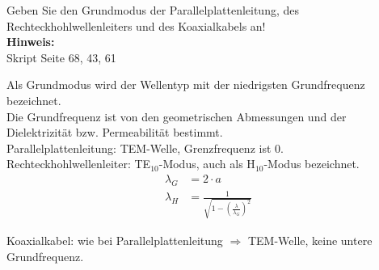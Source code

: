 \begin{question}[section=6,name={Grundmodus vergleichen},difficulty=,quantity=2,type=thr,tags={20131210}]
	Geben Sie den Grundmodus der Parallelplattenleitung, des Rechteckhohlwellenleiters und des Koaxialkabels an!
	\\ \textbf{Hinweis:}\\
	Skript Seite 68, 43, 61
\end{question}
\begin{solution}
	Als Grundmodus wird der Wellentyp mit der niedrigsten Grundfrequenz bezeichnet.\\
Die Grundfrequenz ist von den geometrischen Abmessungen und der Dielektrizität bzw. Permeabilität bestimmt.\\

Parallelplattenleitung: TEM-Welle, Grenzfrequenz ist \unit{0}\hertz.\\


Rechteckhohlwellenleiter: TE$_{10}$-Modus, auch als H$_{10}$-Modus bezeichnet.\\
\begin{align}
	\lambda_G &= 2 \cdot a \qquad\quad \\
	\lambda_H &= \frac{1}{\sqrt{1-\left(\frac{\lambda}{\lambda_G}\right)^2}}
\end{align}

Koaxialkabel: wie bei Parallelplattenleitung $\Rightarrow$ TEM-Welle, keine untere Grundfrequenz.
\end{solution}